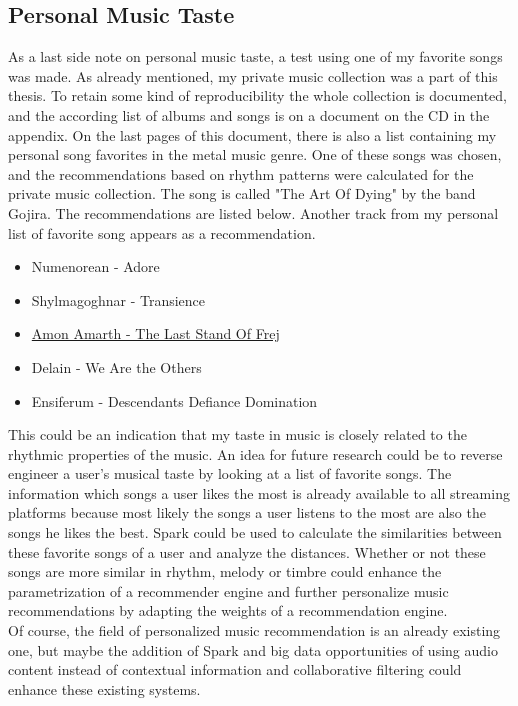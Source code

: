 \subsection{Personal Music Taste}\label{personal}

As a last side note on personal music taste, a test using one of my favorite songs was made. As already mentioned, my private music collection was a part of this thesis. To retain some kind of reproducibility the whole collection is documented, and the according list of albums and songs is on a document on the CD in the appendix. On the last pages of this document, there is also a list containing my personal song favorites in the metal music genre. One of these songs was chosen, and the recommendations based on rhythm patterns were calculated for the private music collection. The song is called "The Art Of Dying" by the band Gojira. The recommendations are listed below. Another track from my personal list of favorite song appears as a recommendation. 

\begin{itemize}
	\setlength\itemsep{-0.5em}
	\item Numenorean - Adore
	\item Shylmagoghnar - Transience
	\item \underline{Amon Amarth - The Last Stand Of Frej}
	\item Delain - We Are the Others
	\item Ensiferum - Descendants Defiance Domination
\end{itemize}

\noindent This could be an indication that my taste in music is closely related to the rhythmic properties of the music. 
An idea for future research could be to reverse engineer a user's musical taste by looking at a list of favorite songs. The information which songs a user likes the most is already available to all streaming platforms because most likely the songs a user listens to the most are also the songs he likes the best. Spark could be used to calculate the similarities between these favorite songs of a user and analyze the distances. Whether or not these songs are more similar in rhythm, melody or timbre could enhance the parametrization of a recommender engine and further personalize music recommendations by adapting the weights of a recommendation engine.\\
Of course, the field of personalized music recommendation is an already existing one, but maybe the addition of Spark and big data opportunities of using audio content instead of contextual information and collaborative filtering could enhance these existing systems. 

